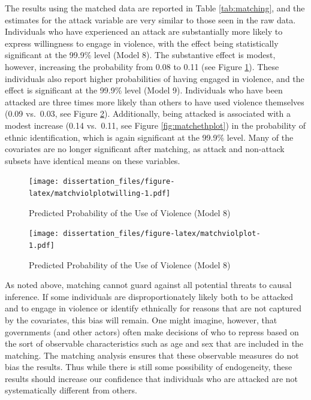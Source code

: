 \documentclass[12pt,]{book}
\theoremstyle{definition}
\theoremstyle{definition}
\theoremstyle{definition}
\theoremstyle{remark}
\begin{document}
The results using the matched data are reported in Table
\ref{tab:matching}, and the estimates for the attack variable are very
similar to those seen in the raw data. Individuals who have experienced
an attack are substantially more likely to express willingness to engage
in violence, with the effect being statistically significant at the
99.9\% level (Model 8). The substantive effect is modest, however,
increasing the probability from 0.08 to 0.11 (see Figure
\ref{fig:matchviolplotwilling}). These individuals also report higher
probabilities of having engaged in violence, and the effect is
significant at the 99.9\% level (Model 9). Individuals who have been
attacked are three times more likely than others to have used violence
themselves (0.09 vs.~0.03, see Figure \ref{fig:matchviolplot}).
Additionally, being attacked is associated with a modest increase (0.14
vs.~0.11, see Figure \ref{fig:matchethplot}) in the probability of
ethnic identification, which is again significant at the 99.9\% level.
Many of the covariates are no longer significant after matching, as
attack and non-attack subsets have identical means on these variables.

\begin{figure}
\centering
\texttt{[image: dissertation\_files/figure-latex/matchviolplotwilling-1.pdf]}
\caption{\label{fig:matchviolplotwilling}Predicted Probability of the Use of
Violence (Model 8)}
\end{figure}

\begin{figure}
\centering
\texttt{[image: dissertation\_files/figure-latex/matchviolplot-1.pdf]}
\caption{\label{fig:matchviolplot}Predicted Probability of the Use of
Violence (Model 8)}
\end{figure}

As noted above, matching cannot guard against all potential threats to
causal inference. If some individuals are disproportionately likely both
to be attacked and to engage in violence or identify ethnically for
reasons that are not captured by the covariates, this bias will remain.
One might imagine, however, that governments (and other actors) often
make decisions of who to repress based on the sort of observable
characteristics such as age and sex that are included in the matching.
The matching analysis ensures that these observable measures do not bias
the results. Thus while there is still some possibility of endogeneity,
these results should increase our confidence that individuals who are
attacked are not systematically different from others.
\end{document}
